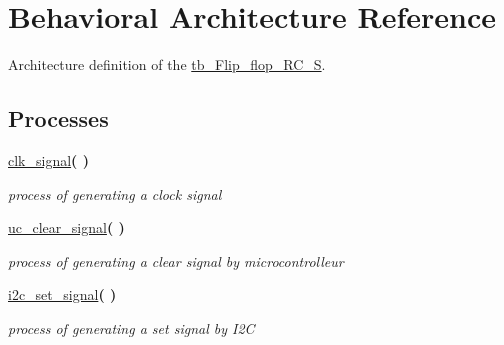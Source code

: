 \hypertarget{classtb___flip__flop___r_c___s_1_1_behavioral}{}\section{Behavioral Architecture Reference}
\label{classtb___flip__flop___r_c___s_1_1_behavioral}


Architecture definition of the \hyperlink{classtb___flip__flop___r_c___s}{tb\+\_\+\+Flip\+\_\+flop\+\_\+\+R\+C\+\_\+S}.  


\subsection*{Processes}
 \begin{DoxyCompactItemize}
\item 
\hyperlink{classtb___flip__flop___r_c___s_1_1_behavioral_a99f3164d142507cc4972fec85ccfe73a}{clk\+\_\+signal}{\bfseries  (  )}\hypertarget{classtb___flip__flop___r_c___s_1_1_behavioral_a99f3164d142507cc4972fec85ccfe73a}{}\label{classtb___flip__flop___r_c___s_1_1_behavioral_a99f3164d142507cc4972fec85ccfe73a}

\begin{DoxyCompactList}\small\item\em process of generating a clock signal \end{DoxyCompactList}\item 
\hyperlink{classtb___flip__flop___r_c___s_1_1_behavioral_a35fbcf057a197de16f02ae1e198de883}{uc\+\_\+clear\+\_\+signal}{\bfseries  (  )}\hypertarget{classtb___flip__flop___r_c___s_1_1_behavioral_a35fbcf057a197de16f02ae1e198de883}{}\label{classtb___flip__flop___r_c___s_1_1_behavioral_a35fbcf057a197de16f02ae1e198de883}

\begin{DoxyCompactList}\small\item\em process of generating a clear signal by microcontrolleur \end{DoxyCompactList}\item 
\hyperlink{classtb___flip__flop___r_c___s_1_1_behavioral_a35b5be3cd1cb6c47815781e90ca773c6}{i2c\+\_\+set\+\_\+signal}{\bfseries  (  )}\hypertarget{classtb___flip__flop___r_c___s_1_1_behavioral_a35b5be3cd1cb6c47815781e90ca773c6}{}\label{classtb___flip__flop___r_c___s_1_1_behavioral_a35b5be3cd1cb6c47815781e90ca773c6}

\begin{DoxyCompactList}\small\item\em process of generating a set signal by I2C \end{DoxyCompactList}\end{DoxyCompactItemize}
